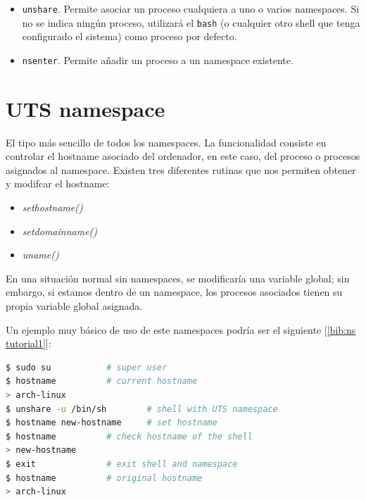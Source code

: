 \documentclass[a4paper, oneside, 12pt]{book}
\begin{document}
	\begin{itemize}
		\item \texttt{unshare}. Permite asociar un proceso cualquiera a uno o varios namespaces. Si no se indica ningún proceso, utilizará el \texttt{bash} (o cualquier otro shell que tenga configurado el sistema) como proceso por defecto.
		
		\item \texttt{nsenter}. Permite añadir un proceso a un namespace existente.	
	\end{itemize}
	
	
	\section{UTS namespace}
	\label{sect: uts namespace}
	\par \noindent El tipo más sencillo de todos los namespaces. La funcionalidad consiste en controlar el hostname asociado del ordenador, en este caso, del proceso o procesos asignados al namespace. Existen tres diferentes rutinas que nos permiten obtener y modifcar el hostname: 
	\begin{itemize}
		\item \textit{sethostname()}
		\item \textit{setdomainname()}
		\item \textit{uname()}
	\end{itemize}
	En una situación normal sin namespaces, se modificaría una variable global; sin embargo, si estamos dentro de un namespace, los procesos asociados tienen su propia variable global asignada.\\
	
	\par \noindent Un ejemplo muy básico de uso de este namespaces podría ser el siguiente [\ref{bib:ns tutorial1}]:\\
	\begin{lstlisting}[language=bash, caption=Ejemplo de uso de UTS namespace]
$ sudo su			# super user
$ hostname			# current hostname
> arch-linux					
$ unshare -u /bin/sh		# shell with UTS namespace
$ hostname new-hostname		# set hostname
$ hostname			# check hostname of the shell
> new-hostname
$ exit				# exit shell and namespace
$ hostname			# original hostname
> arch-linux
	\end{lstlisting}
\end{document}
